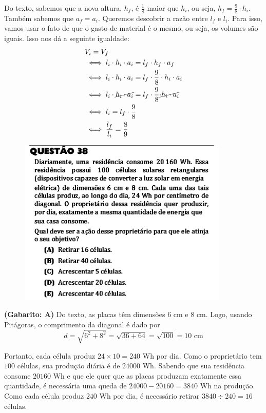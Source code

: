 \documentclass[a4paper]{article}
\begin{document}
\par\vspace{0.3cm} Do texto, sabemos que a nova altura, $h_f$, é $\displaystyle{ \frac{1}{8} }$ maior que $h_i$, ou seja, $\displaystyle{ h_f = \frac{9}{8}\cdot h_i }$. Também sabemos que $a_f = a_i$. Queremos descobrir a razão entre $l_f$ e $l_i$. Para isso, vamos usar o fato de que o gasto de material é o mesmo, ou seja, os volumes são iguais. Isso nos dá a seguinte igualdade:
\begin{align*}
&V_i = V_f \\ 
&\iff l_i\cdot h_i\cdot a_i = l_f\cdot h_f \cdot a_f \\
&\iff l_i\cdot h_i \cdot a_i = l_f\cdot \frac{9}{8}\cdot h_i\cdot a_i \\
&\iff l_i\cdot \cancel{h_i \cdot a_i} = l_f\cdot \frac{9}{8}\cancel{\cdot h_i\cdot a_i} \\
&\iff  l_i = l_f\cdot \frac{9}{8} \\
&\iff \frac{l_f}{l_i} = \frac{8}{9}
\end{align*}
\begin{figure}[H]
	\begin{center}
		\includegraphics[width=10cm]{L2Q38.png}
	\end{center}
\end{figure}
\par\textbf{(Gabarito: A)} Do texto, as placas têm dimensões $6$ cm e $8$ cm. Logo, usando Pitágoras, o comprimento da diagonal é dado por
\begin{equation*}
d = \sqrt{6^2 + 8^2} = \sqrt{36+64} = \sqrt{100} = 10\text{ cm}
\end{equation*}
\par\vspace{0.3cm} Portanto, cada célula produz $24\times 10 = 240$ Wh por dia. Como o proprietário tem $100$ células, sua produção diária é de $24000$ Wh. Sabendo que sua residência consome $20160$ Wh e que ele quer que as placas produzam exatamente essa quantidade, é necessária uma queda de $24000 - 20160 = 3840$ Wh na produção. Como cada célula produz $240$ Wh por dia, é necessário retirar $3840\div 240 = 16$ células.
\end{document}
